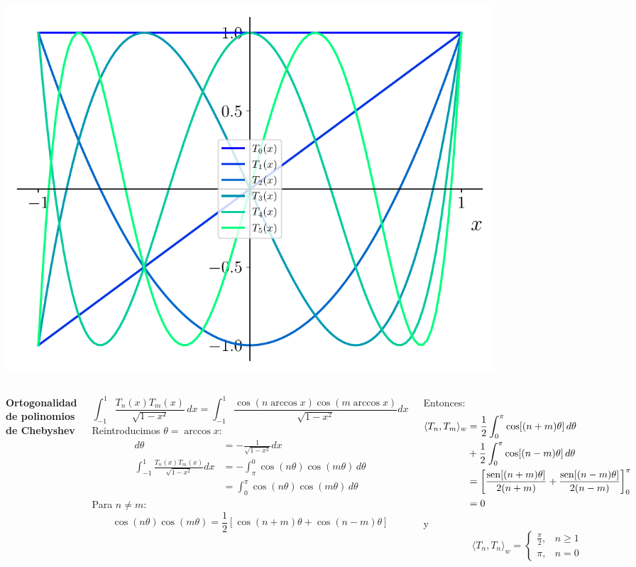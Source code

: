 \documentclass[9pt, aspectratio=169]{beamer}
\begin{document}
\begin{frame}
\begin{columns}[t]
\begin{center}
    \includegraphics[width=0.8\textwidth]{figs/fig-11.pdf}
\end{center}
\end{columns}
\end{frame}

\begin{frame}
\begin{columns}[t]
\cx
\textbf{ Ortogonalidad de polinomios de Chebyshev }

\[ \int_{-1}^1 \frac{T_n(x) T_m(x)}{\sqrt{1 - x²}} \, dx = \int_{-1}^1 \frac{\cos(n \arccos x) \cos(m \arccos x)}{\sqrt{1 - x^2}} dx \]
Reintroducimos $\theta = \arccos x$:
\begin{align*}
d\theta &= -\frac{1}{\sqrt{1 - x^2}} dx \\
\int_{-1}^1 \frac{T_n(x) T_m(x)}{\sqrt {1 - x^2}} dx &= -\int_{\pi}^0 \cos(n \theta) \cos(m \theta) \, d\theta \\
  &= \int_{0}^{\pi} \cos(n \theta) \cos(m \theta) \, d\theta 
\end{align*}
Para $n \neq m$:
\[ \cos(n \theta) \cos(m \theta) = \frac{1}{2}[\cos(n+m) \theta + \cos(n-m)\theta] \]

\vspace{7em}

Entonces:
\begin{align*}
    \langle T_n, T_m \rangle_w &= \frac{1}{2} \int_0^{\pi} \cos[(n+m) \theta] \, d\theta \\
      &+\frac{1}{2} \int_0^{\pi} \cos[(n-m) \theta] \, d\theta \\
      &= \left[ \frac{\operatorname{sen}[(n+m) \theta]}{2(n+m)} + \frac{\operatorname{sen}[(n-m) \theta]}{2(n-m)} \right]_0^{\pi}  \\
      &= 0
\end{align*}
y
\[ \langle T_n, T_n \rangle_w = 
    \begin{cases}
    \frac{\pi}{2}, &n \geq 1 \\
    \pi, &n = 0
\end{cases} \]
\end{columns}
\end{frame}
\end{document}
